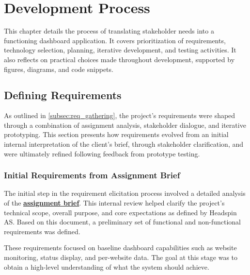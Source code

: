 \chapter{Development Process}
\label{ch:development_process}

This chapter details the process of translating stakeholder needs into a functioning dashboard application. It covers prioritization of requirements, technology selection, planning, iterative development, and testing activities. It also reflects on practical choices made throughout development, supported by figures, diagrams, and code snippets.

\section{Defining Requirements}
\label{sec:def_req}

As outlined in \autoref{subsec:req_gathering}, the project’s requirements were shaped through a combination of assignment analysis, stakeholder dialogue, and iterative prototyping. This section presents how requirements evolved from an initial internal interpretation of the client’s brief, through stakeholder clarification, and were ultimately refined following feedback from prototype testing.

\subsection{Initial Requirements from Assignment Brief}
\label{subsec:req_from_brief}
The initial step in the requirement elicitation process involved a detailed analysis of the \textbf{\hyperref[app:headspin-brief]{assignment brief}}. This internal review helped clarify the project’s technical scope, overall purpose, and core expectations as defined by Headspin AS. Based on this document, a preliminary set of functional and non-functional requirements was defined.

These requirements focused on baseline dashboard capabilities such as website monitoring, status display, and per-website data. The goal at this stage was to obtain a high-level understanding of what the system should achieve.

